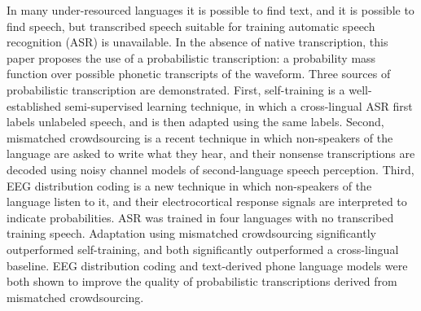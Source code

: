 In many under-resourced languages it is possible to find text, and it
is possible to find speech, but transcribed speech suitable for
training automatic speech recognition (ASR) is unavailable.  In the
absence of native transcription, this paper proposes the use of a
probabilistic transcription: a probability mass function over possible
phonetic transcripts of the waveform.  Three sources of probabilistic
transcription are demonstrated.  First, self-training is a
well-established semi-supervised learning technique, in which a
cross-lingual ASR first labels unlabeled speech, and is then adapted
using the same labels.  Second, mismatched crowdsourcing is a recent
technique in which non-speakers of the language are asked to write
what they hear, and their nonsense transcriptions are decoded using
noisy channel models of second-language speech perception.  Third, EEG
distribution coding is a new technique in which non-speakers of the
language listen to it, and their electrocortical response signals are
interpreted to indicate probabilities.  ASR was trained in four
languages with no transcribed training speech.  Adaptation using
mismatched crowdsourcing significantly outperformed self-training, and
both significantly outperformed a cross-lingual baseline.  EEG
distribution coding and text-derived phone language models were both
shown to improve the quality of probabilistic transcriptions derived
from mismatched crowdsourcing.
